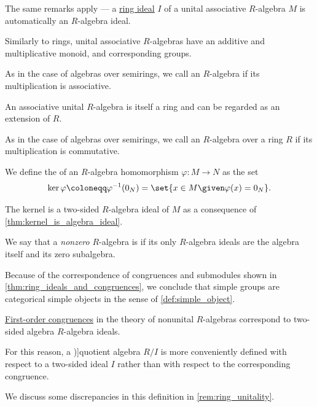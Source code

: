 \begin{definition}
\begin{thmenum}[resume=def:algebra_over_ring]
    The same remarks apply --- a \hyperref[def:ring/ideal]{ring ideal} \( I \) of a unital associative \( R \)-algebra \( M \) is automatically an \( R \)-algebra ideal.

    \mimprovised Similarly to rings, unital associative \( R \)-algebras have an additive and multiplicative monoid, and corresponding groups.

     As in the case of algebras over semirings, we call an \( R \)-algebra  if its multiplication is associative.

    An associative unital \( R \)-algebra is itself a ring and can be regarded as an extension of \( R \).

     As in the case of algebras over semirings, we call an \( R \)-algebra over a ring \( R \)  if its multiplication is commutative.

     We define the  of an \( R \)-algebra homomorphism \( \varphi: M \to N \) as the set
    \begin{equation}\label{eq:def:algebra_over_ring/kernel}
      \ker \varphi \coloneqq \varphi^{-1}(0_N) = \set{ x \in M \given \varphi(x) = 0_N }.
    \end{equation}

    The kernel is a two-sided \( R \)-algebra ideal of \( M \) as a consequence of \cref{thm:kernel_is_algebra_ideal}.

     We say that a \emph{nonzero} \( R \)-algebra is  if its only \( R \)-algebra ideals are the algebra itself and its zero subalgebra.

    Because of the correspondence of congruences and submodules shown in \cref{thm:ring_ideals_and_congruences}, we conclude that simple groups are categorical simple objects in the sense of \cref{def:simple_object}.

    \mimprovised \hyperref[def:fol_congruence]{First-order congruences} in the theory of nonunital \( R \)-algebras correspond to two-sided algebra \( R \)-algebra ideals.

    For this reason, a \term[en=quotient algebra (\cite[430]{Bourbaki1998Algebra1to3})]{quotient algebra} \( R / I \) is more conveniently defined with respect to a two-sided ideal \( I \) rather than with respect to the corresponding congruence.
  \end{thmenum}
\end{definition}
\begin{comments}
  \item We discuss some discrepancies in this definition in \cref{rem:ring_unitality}.
\end{comments}

